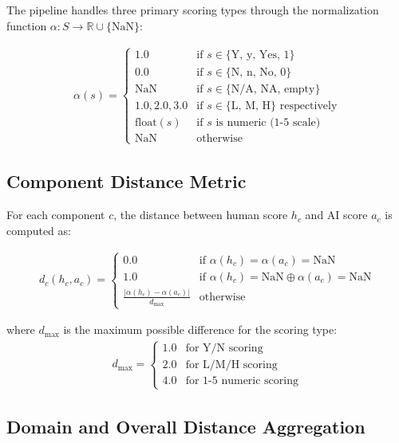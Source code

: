 \documentclass[12pt]{article}
\begin{document}
The pipeline handles three primary scoring types through the normalization function $\alpha: S \rightarrow \mathbb{R} \cup \{\text{NaN}\}$:

\begin{align}
\alpha(s) = \begin{cases}
1.0 & \text{if } s \in \{\text{Y, y, Yes, 1}\} \\
0.0 & \text{if } s \in \{\text{N, n, No, 0}\} \\
\text{NaN} & \text{if } s \in \{\text{N/A, NA, empty}\} \\
1.0, 2.0, 3.0 & \text{if } s \in \{\text{L, M, H}\} \text{ respectively} \\
\text{float}(s) & \text{if } s \text{ is numeric (1-5 scale)} \\
\text{NaN} & \text{otherwise}
\end{cases}
\end{align}

\subsection{Component Distance Metric}

For each component $c$, the distance between human score $h_c$ and AI score $a_c$ is computed as:

\begin{align}
d_c(h_c, a_c) = \begin{cases}
0.0 & \text{if } \alpha(h_c) = \alpha(a_c) = \text{NaN} \\
1.0 & \text{if } \alpha(h_c) = \text{NaN} \oplus \alpha(a_c) = \text{NaN} \\
\frac{|\alpha(h_c) - \alpha(a_c)|}{d_{\max}} & \text{otherwise}
\end{cases}
\end{align}

where $d_{\max}$ is the maximum possible difference for the scoring type:
\begin{align}
d_{\max} = \begin{cases}
1.0 & \text{for Y/N scoring} \\
2.0 & \text{for L/M/H scoring} \\
4.0 & \text{for 1-5 numeric scoring}
\end{cases}
\end{align}

\subsection{Domain and Overall Distance Aggregation}
\end{document}
